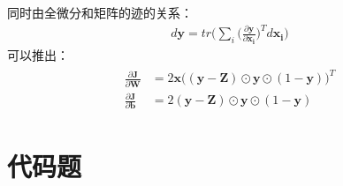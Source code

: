 \documentclass{article}
\begin{document}
同时由全微分和矩阵的迹的关系：
\begin{eqnarray}
    d\mathbf{y}=tr\Big(\sum_i\big(\frac{\partial\mathbf{y}}{\partial\mathbf{x_i}}\big)^Td\mathbf{x_i}\Big)
\end{eqnarray}
可以推出：
\begin{eqnarray*}
    \begin{aligned}
    \frac{\partial\mathbf{J}}{\partial\mathbf{W}}&=2\mathbf{x}\big((\mathbf{y}-\mathbf{Z})\odot\mathbf{y}\odot(1-\mathbf{y})\big)^T\\
    \frac{\partial\mathbf{J}}{\partial\mathbf{b}}&=2(\mathbf{y}-\mathbf{Z})\odot\mathbf{y}\odot(1-\mathbf{y})
    \end{aligned}
\end{eqnarray*}
\section{代码题}
\end{document}
